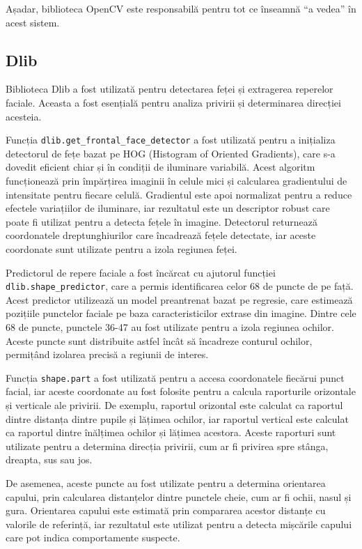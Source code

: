 \documentclass[12pt,a4paper]{article}
\begin{document}
Așadar, biblioteca OpenCV este responsabilă pentru tot ce înseamnă ``a
vedea'' în acest sistem.

\subsection{Dlib}
Biblioteca Dlib a fost utilizată pentru detectarea feței și extragerea reperelor faciale\cite{el2023drowsiness}. Aceasta a fost esențială pentru analiza privirii și determinarea direcției acesteia. 

Funcția \texttt{dlib.get\_frontal\_face\_detector} a fost utilizată pentru a inițializa detectorul de fețe bazat pe HOG (Histogram of Oriented Gradients), care s-a dovedit eficient chiar și în condiții de iluminare variabilă. Acest algoritm funcționează prin împărțirea imaginii în celule mici și calcularea gradientului de intensitate pentru fiecare celulă. Gradientul este apoi normalizat pentru a reduce efectele variațiilor de iluminare, iar rezultatul este un descriptor robust care poate fi utilizat pentru a detecta fețele în imagine. Detectorul returnează coordonatele dreptunghiurilor care încadrează fețele detectate, iar aceste coordonate sunt utilizate pentru a izola regiunea feței.

Predictorul de repere faciale a fost încărcat cu ajutorul funcției \texttt{dlib.shape\_predictor}, care a permis identificarea celor 68 de puncte de pe față. Acest predictor utilizează un model preantrenat bazat pe regresie, care estimează pozițiile punctelor faciale pe baza caracteristicilor extrase din imagine. Dintre cele 68 de puncte, punctele 36-47 au fost utilizate pentru a izola regiunea ochilor. Aceste puncte sunt distribuite astfel încât să încadreze conturul ochilor, permițând izolarea precisă a regiunii de interes.

Funcția \texttt{shape.part} a fost utilizată pentru a accesa coordonatele fiecărui punct facial, iar aceste coordonate au fost folosite pentru a calcula raporturile orizontale și verticale ale privirii. De exemplu, raportul orizontal este calculat ca raportul dintre distanța dintre pupile și lățimea ochilor, iar raportul vertical este calculat ca raportul dintre înălțimea ochilor și lățimea acestora. Aceste raporturi sunt utilizate pentru a determina direcția privirii, cum ar fi privirea spre stânga, dreapta, sus sau jos.

De asemenea, aceste puncte au fost utilizate pentru a determina orientarea capului, prin calcularea distanțelor dintre punctele cheie, cum ar fi ochii, nasul și gura. Orientarea capului este estimată prin compararea acestor distanțe cu valorile de referință, iar rezultatul este utilizat pentru a detecta mișcările capului care pot indica comportamente suspecte.
\end{document}
